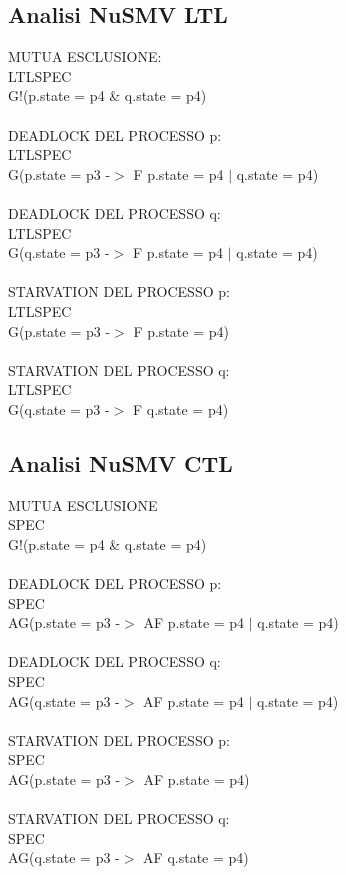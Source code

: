 \documentclass{article}
\begin{document}
\subsection{Analisi NuSMV LTL}
MUTUA ESCLUSIONE:
\\LTLSPEC
\\G!(p.state = p4 \& q.state = p4)
\\\\DEADLOCK DEL PROCESSO p:
\\LTLSPEC
\\G(p.state = p3 -$>$ F p.state = p4 $|$ q.state = p4)
\\\\DEADLOCK DEL PROCESSO q:
\\LTLSPEC
\\G(q.state = p3 -$>$ F p.state = p4 $|$ q.state = p4)
\\\\STARVATION DEL PROCESSO p:
\\LTLSPEC
\\G(p.state = p3 -$>$ F p.state = p4)
\\\\STARVATION DEL PROCESSO q:
\\LTLSPEC
\\G(q.state = p3 -$>$ F q.state = p4)
\subsection{Analisi NuSMV CTL}
MUTUA ESCLUSIONE
\\SPEC
\\G!(p.state = p4 \& q.state = p4)
\\\\DEADLOCK DEL PROCESSO p:
\\SPEC
\\AG(p.state = p3 -$>$ AF p.state = p4 $|$ q.state = p4)
\\\\DEADLOCK DEL PROCESSO q:
\\SPEC
\\AG(q.state = p3 -$>$ AF p.state = p4 $|$ q.state = p4)
\\\\STARVATION DEL PROCESSO p:
\\SPEC
\\AG(p.state = p3 -$>$ AF p.state = p4)
\\\\STARVATION DEL PROCESSO q:
\\SPEC
\\AG(q.state = p3 -$>$ AF q.state = p4)
\clearpage
\end{document}
